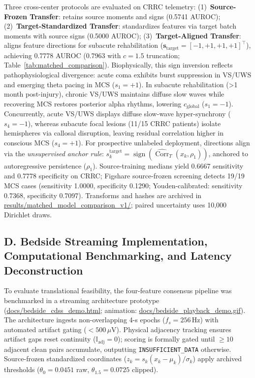 \documentclass[journal,twoside,web]{ieeecolor}
\begin{document}
Three cross-center protocols are evaluated on CRRC telemetry: (1)~\textbf{Source-Frozen Transfer}: retains source moments and signs (0.5741 AUROC); (2)~\textbf{Target-Standardized Transfer}: standardizes features via target batch moments with source signs (0.5000 AUROC); (3)~\textbf{Target-Aligned Transfer}: aligns feature directions for subacute rehabilitation ($\mathbf{s}_{\text{target}}=[-1,+1,+1,+1]^\top$), achieving 0.7778 AUROC (0.7963 with $c=1.5$ truncation; Table~\ref{tab:matched_comparison}). Biophysically, this sign inversion reflects pathophysiological divergence: acute coma exhibits burst suppression in VS/UWS and emerging theta pacing in MCS ($s_1 = +1$). In subacute rehabilitation (>1 month post-injury), chronic VS/UWS maintains diffuse slow waves while recovering MCS restores posterior alpha rhythms, lowering $c_{\text{global}}$ ($s_1 = -1$). Concurrently, acute VS/UWS displays diffuse slow-wave hyper-synchrony ($s_4 = -1$), whereas subacute focal lesions (11/15 CRRC patients) isolate hemispheres via callosal disruption, leaving residual correlation higher in conscious MCS ($s_4 = +1$). For prospective unlabeled deployment, directions align via the \textit{unsupervised anchor rule}: $s_k^{\text{target}} = \operatorname{sign}(\widehat{\operatorname{Corr}}_{T}(x_k, \rho_1))$, anchored to autoregressive persistence ($\rho_1$). Source-training medians yield 0.6667 sensitivity and 0.7778 specificity on CRRC; Figshare source-frozen screening detects 19/19 MCS cases (sensitivity 1.0000, specificity 0.1290; Youden-calibrated: sensitivity 0.7368, specificity 0.7097). Transforms and hashes are archived in \url{results/matched_model_comparison_v1/}; paired uncertainty uses 10,000 Dirichlet draws.



\subsection*{D. Bedside Streaming Implementation, Computational Benchmarking, and Latency Deconstruction}
To evaluate translational feasibility, the four-feature consensus pipeline was benchmarked in a streaming architecture prototype (\url{docs/bedside_cdss_demo.html}; animation: \url{docs/bedside_playback_demo.gif}). The architecture ingests non-overlapping 4-s epochs ($f_s = 256\,\mathrm{Hz}$) with automated artifact gating ($<500\,\mu\mathrm{V}$). Physical adjacency tracking ensures artifact gaps reset continuity ($\mathbb{I}_{\text{adj}} = 0$); scoring is formally gated until $\ge 10$ adjacent clean pairs accumulate, outputting \texttt{INSUFFICIENT\_DATA} otherwise. Source-frozen standardized coordinates ($z_k = s_k(x_k - \mu_k)/\sigma_k$) apply archived thresholds ($\theta_0 = 0.0451$ raw, $\theta_{1.5} = 0.0725$ clipped).
\end{document}
